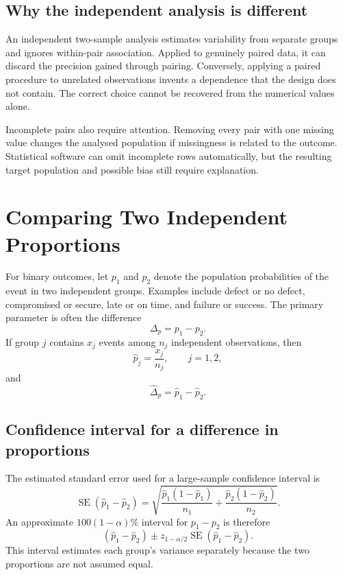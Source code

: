 \subsection{Why the independent analysis is different}

An independent two-sample analysis estimates variability from separate groups and ignores within-pair association. Applied to genuinely paired data, it can discard the precision gained through pairing. Conversely, applying a paired procedure to unrelated observations invents a dependence that the design does not contain. The correct choice cannot be recovered from the numerical values alone.

Incomplete pairs also require attention. Removing every pair with one missing value changes the analysed population if missingness is related to the outcome. Statistical software can omit incomplete rows automatically, but the resulting target population and possible bias still require explanation.

\section{Comparing Two Independent Proportions}
\label{sec:two-proportions}

For binary outcomes, let $p_1$ and $p_2$ denote the population probabilities of the event in two independent groups. Examples include defect or no defect, compromised or secure, late or on time, and failure or success. The primary parameter is often the difference
\[
\Delta_p=p_1-p_2.
\]
If group $j$ contains $x_j$ events among $n_j$ independent observations, then
\[
\widehat p_j=\frac{x_j}{n_j},
\qquad j=1,2,
\]
and
\[
\widehat\Delta_p=\widehat p_1-\widehat p_2.
\]

\subsection{Confidence interval for a difference in proportions}

The estimated standard error used for a large-sample confidence interval is
\[
\operatorname{SE}(\widehat p_1-\widehat p_2)
=
\sqrt{
\frac{\widehat p_1(1-\widehat p_1)}{n_1}
+
\frac{\widehat p_2(1-\widehat p_2)}{n_2}
}.
\]
An approximate $100(1-\alpha)\%$ interval for $p_1-p_2$ is therefore
\[
(\widehat p_1-\widehat p_2)
\pm
z_{1-\alpha/2}
\operatorname{SE}(\widehat p_1-\widehat p_2).
\]
This interval estimates each group's variance separately because the two proportions are not assumed equal.

